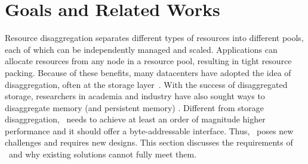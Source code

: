 
%

\section{Goals and Related Works}
\label{sec:motivation}

Resource disaggregation 
separates different types of resources into different pools,
each of which can be independently managed and scaled.
Applications can allocate resources from any node in a resource pool, resulting in tight resource packing. %
Because of these benefits, %
many datacenters have adopted the idea of disaggregation, often at the storage 
layer~\cite{FACEBOOK-BRYCECANYON,FB1,SnowFlake-NSDI20,AMAZON-S3,AMAZON-EBS,Pangu,FC-SAN-book}.
With the success of disaggregated storage, %
researchers in academia and industry have also sought ways to disaggregate memory
(and persistent memory)
\cite{Lim09-disaggregate,FireBox-FASTKeynote,IntelRackScale,Lim12-HPCA,Shan18-OSDI,Shan17-SOCC,RAMCloud,Tsai20-ATC,AIFM,FastSwap,InfiniSwap,Semeru,Nitu18-EUROSYS}.
Different from storage disaggregation,
\md\ needs to achieve at least an order of magnitude higher performance and it should offer a byte-addressable interface.
Thus, \md\ poses new challenges and requires new designs.
This section discusses the requirements of \md\ and why existing solutions cannot fully meet them.

